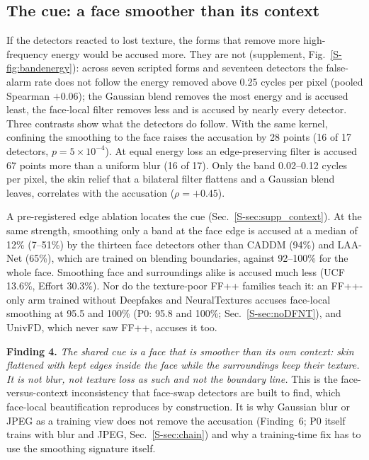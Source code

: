\documentclass[journal]{IEEEtran}  %
\begin{document}
\subsection{The cue: a face smoother than its context}
\label{sec:signature}

If the detectors reacted to lost texture, the forms that remove more high-frequency energy would be accused more. They are
not (supplement, Fig.~\ref{S-fig:bandenergy}): across seven scripted forms and seventeen detectors the false-alarm rate does not follow the
energy removed above 0.25 cycles per pixel (pooled Spearman $+0.06$);
the Gaussian blend removes the most energy and is accused least, the face-local filter removes less and is accused by
nearly every detector. Three contrasts show what the detectors do follow. With the same kernel, confining the smoothing to
the face raises the accusation by 28 points (16 of 17 detectors, $p=5\times10^{-4}$). At equal energy loss an
edge-preserving filter is accused 67 points more than a uniform blur (16 of 17). Only the band 0.02--0.12 cycles per
pixel, the skin relief that a bilateral filter flattens and a Gaussian blend leaves, correlates with the accusation
($\rho=+0.45$).

A pre-registered edge ablation locates the cue (Sec.~\ref{S-sec:supp_context}). At the same strength, smoothing only a band
at the face edge is accused at a median of 12\% (7--51\%) by the thirteen face detectors other than CADDM (94\%) and LAA-Net
(65\%), which are trained on blending boundaries, against 92--100\% for the whole face. Smoothing face and surroundings
alike is accused much less (UCF 13.6\%, Effort 30.3\%).
Nor do the texture-poor FF++ families teach it: an FF++-only arm trained without Deepfakes and NeuralTextures accuses
face-local smoothing at 95.5 and 100\% (P0: 95.8 and 100\%; Sec.~\ref{S-sec:noDFNT}), and UnivFD, which never saw FF++, accuses
it too.

\textbf{Finding 4.} \emph{The shared cue is a face that is smoother than its own context: skin flattened with kept edges
inside the face while the surroundings keep their texture. It is not blur, not texture loss as such and not the boundary
line.} This is the face-versus-context inconsistency that face-swap detectors are built to find, which face-local
beautification reproduces by construction. It is why Gaussian blur or JPEG as a training view does not remove the accusation (Finding~6; P0 itself trains with blur and JPEG, Sec.~\ref{S-sec:chain}) and why a training-time fix has to use the smoothing signature itself.
\end{document}
